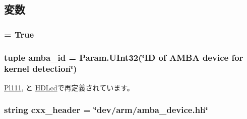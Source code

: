 \subsection{変数}
\hypertarget{classRealView_1_1AmbaDmaDevice_a17fa61ac3806b481cafee5593b55e5d0}{
\subsubsection[{abstract}]{ = True}}
\label{classRealView_1_1AmbaDmaDevice_a17fa61ac3806b481cafee5593b55e5d0}
\hypertarget{classRealView_1_1AmbaDmaDevice_ad9d2b9e37de5c1c7c10219fc1b834599}{
\subsubsection[{amba\_\-id}]{\setlength{\rightskip}{0pt plus 5cm}tuple {\bf amba\_\-id} = Param.UInt32(\char`\"{}ID of AMBA device for kernel detection\char`\"{})}}
\label{classRealView_1_1AmbaDmaDevice_ad9d2b9e37de5c1c7c10219fc1b834599}


\hyperlink{classRealView_1_1Pl111_a38d7b9edfe6f0eea7a54e7e4f6253f3a}{Pl111}, と \hyperlink{classRealView_1_1HDLcd_a38d7b9edfe6f0eea7a54e7e4f6253f3a}{HDLcd}で再定義されています。\hypertarget{classRealView_1_1AmbaDmaDevice_a17da7064bc5c518791f0c891eff05fda}{
\subsubsection[{cxx\_\-header}]{\setlength{\rightskip}{0pt plus 5cm}string {\bf cxx\_\-header} = \char`\"{}dev/arm/amba\_\-device.hh\char`\"{}}}
\label{classRealView_1_1AmbaDmaDevice_a17da7064bc5c518791f0c891eff05fda}


